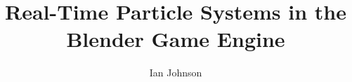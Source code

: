 \documentclass[11pt]{fsuthesis}
\title{Real-Time Particle Systems in the Blender Game Engine}
\author{Ian Johnson}
\begin{document}
\frontmatter
\maketitle
\makesignaturepage

\begin{dedication}
\end{dedication}

\begin{acknowledgments}
\end{acknowledgments}

\tableofcontents
\listoffigures


\end{document}
